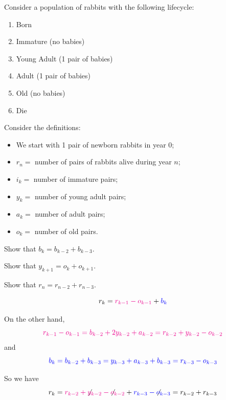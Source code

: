 \begin{minipage}{.45\textwidth}
\question \label{rabbitscomplicatedproof}
	Consider a population of rabbits with the following lifecycle:
	\begin{enumerate}[start=0,label=(year \arabic*)]
		\item Born
		\item Immature (no babies)
		\item Young Adult (1 pair of babies)
		\item Adult (1 pair of babies)
		\item Old (no babies)
		\item Die \\[5pt]
	\end{enumerate}	
	
\end{minipage}
\qquad
\begin{minipage}{.45\textwidth}
	Consider the definitions:
	\begin{itemize}
		\item We start with 1 pair of newborn rabbits in year 0;
		\item $r_n=$ number of pairs of rabbits alive during year $n$;
		\item $i_k=$ number of immature pairs;
		\item $y_k=$ number of young adult pairs;
		\item $a_k=$ number of adult pairs;
		\item $o_k=$ number of old pairs.
	\end{itemize}

\end{minipage}

	\begin{parts}
		\item Show that $b_k=b_{k-2}+b_{k-3}$.
		\item Show that $y_{k+1}=o_{k}+o_{k+1}$.
		\item Show that $r_{n} = r_{n-2}+r_{n-3}$.
	\end{parts}

\begin{annotation}
\begin{goals}
$$
r_k 
	= {\color{magenta}r_{k-1}-o_{k-1}}+{\color{blue}b_k}
$$

On the other hand, 
$$
\color{magenta}
r_{k-1}-o_{k-1}
  = b_{k-2} + 2 y_{k-2} + a_{k-2} 
  = r_{k-2} + y_{k-2} - o_{k-2}
$$
and
$$
\color{blue}
b_k 
  = b_{k-2}+b_{k-3}
  = y_{k-3} + a_{k-3} + b_{k-3}
  = r_{k-3} - o_{k-3}
$$

So we have
$$
r_k = {\color{magenta}r_{k-2} + {\color{black}\not} y_{k-2} - {\color{black}\not} o_{k-2}} + {\color{blue}r_{k-3} - {\color{black}\not}o_{k-3}}
= r_{k-2} + r_{k-3}
$$
\end{goals}
\end{annotation}	

